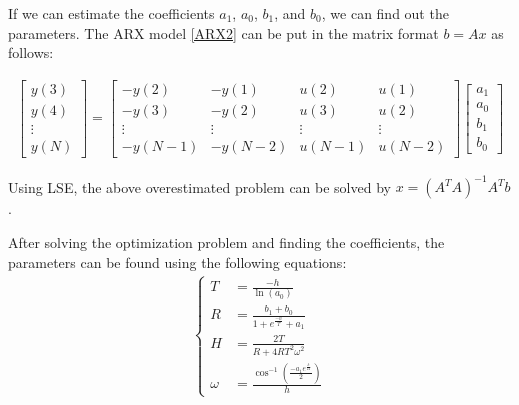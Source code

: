 \documentclass[10pt,journal,final]{IEEEtran}
\begin{document}
If we can estimate the coefficients $a_{1}$, $a_{0}$, $b_{1}$, and $b_{0}$, we can find out the parameters. The ARX model \eqref{ARX2} can be put in the matrix format $b=Ax$ as follows:
\begin{footnotesize}
\begin{align}\label{mat}
\begin{bmatrix}
y(3) \\ y(4) \\ \vdots \\ y(N)
\end{bmatrix}
 = \begin{bmatrix}
{-}y(2) & {-}y(1)& u(2) & u(1)  \\
{-}y(3)   & {-}y(2) &u(3) & u(2)  \\
\vdots   & \vdots &\vdots &\vdots\\
{-}y(N-1) &{-}y(N-2)  & u(N-1) & u(N-2)
\end{bmatrix}
\begin{bmatrix}
a_1  \\ a_0\\  b_1 \\ b_0
\end{bmatrix}
\end{align}
\end{footnotesize}
Using  LSE, the above overestimated problem can be solved by $x=(A^{T}A)^{-1}A^{T}b$. 

After solving the optimization problem and finding the coefficients, the parameters can be found using the following {equations}:
\begin{align}
\begin{cases}
T&=\frac{-h}{\ln{(a_{0})}}\\
R&=\frac{b_{1}+b_{0}}{1+e^{\frac{-h}{T}}+a_{1}}\\
H&=\frac{2T}{R+4RT^{2}\omega^{2}}\\
\omega&=\frac{\cos^{-1}{\left(\frac{-a_{1}e^{\frac{h}{2T}}}{2} \right)}}{h}
\end{cases}
 \end{align}
\end{document}
